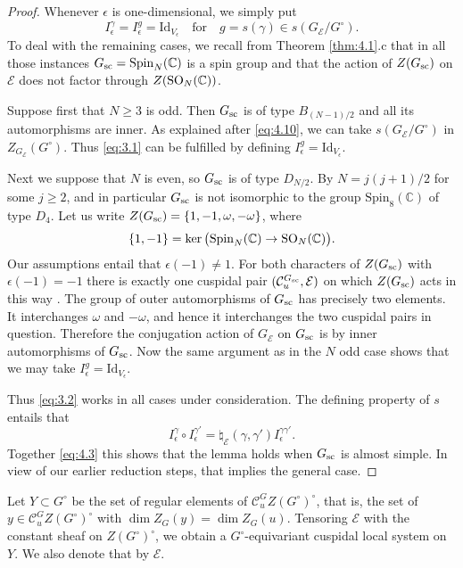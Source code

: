\documentclass[11pt]{amsart}
\theoremstyle{definition}
\newcommand{\C}{\mathbb C}
\def\SO{{\rm SO}}
\def\cC{{\mathcal C}}
\def\cE{{\mathcal E}}
\def\sc{{\rm sc}}
\begin{document}
\begin{proof}
Whenever $\epsilon$ is one-dimensional, we simply put 
\begin{equation}\label{eq:3.2}
I^\gamma_\epsilon = I^g_\epsilon = \mathrm{Id}_{V_\epsilon} \quad \text{for} 
\quad g = s(\gamma) \in s (G_\cE / G^\circ) .
\end{equation}
To deal with the remaining cases, we recall from Theorem \ref{thm:4.1}.c that in
all those instances $G_\sc = \mathrm{Spin}_N (\C)$ is a spin group and that the
action of $Z(G_\sc)$ on $\cE$ does not factor through $Z(\SO_N (\C))$.

Suppose first that $N \geq 3$ is odd. Then $G_\sc$ is of type $B_{(N-1)/2}$ and all
its automorphisms are inner. As explained after \eqref{eq:4.10}, we can take
$s (G_\cE / G^\circ)$ in $Z_{G_\cE}(G^\circ)$. Thus \eqref{eq:3.1} can be fulfilled
by defining $I^g_\epsilon = \mathrm{Id}_{V_\epsilon}$. 

Next we suppose that $N$ is even, so $G_\sc$ is of type $D_{N/2}$. By 
\cite[Proposition 14.6]{Lus1} $N = j (j+1) / 2$ for some $j \geq 2$, and in particular
$G_\sc$ is not isomorphic to the group $\mathrm{Spin}_8 (\C)$ of type $D_4$. 
Let us write $Z(G_\sc) = \{1,-1,\omega,-\omega\}$, where
\[
\{1,-1\} = \ker \big( \mathrm{Spin}_N (\C) \to \SO_N (\C) \big) . 
\]
Our assumptions entail that $\epsilon (-1) \neq 1$. For both characters of $Z(G_\sc)$
with $\epsilon (-1) = -1$ there is exactly one cuspidal pair $(\cC_u^{G_\sc},\cE)$ on 
which $Z (G_\sc)$ acts in this way \cite[Proposition 14.6]{Lus1}. The group of outer 
automorphisms of $G_\sc$ has precisely two elements. It interchanges $\omega$ and
$-\omega$, and hence it interchanges the two cuspidal pairs in question. Therefore 
the conjugation action of $G_\cE$ on $G_\sc$ is by inner automorphisms
of $G_\sc$. Now the same argument as in the $N$ odd case shows that we may take
$I^g_\epsilon = \mathrm{Id}_{V_\epsilon}$. 

Thus \eqref{eq:3.2} works in all cases under consideration. The defining property 
of $s$ entails that
\begin{equation}\label{eq:4.2}
I^\gamma_\epsilon \circ I^{\gamma'}_\epsilon = \natural_\cE (\gamma,\gamma') 
I^{\gamma \gamma'}_\epsilon .
\end{equation}
Together \eqref{eq:4.3} this shows that the lemma holds when $G_{\sc}$ is almost 
simple. In view of our earlier reduction steps, that implies the general case.
\end{proof}

Let $Y \subset G^\circ$ be the set of regular elements of $\cC_u^G Z(G^\circ)^\circ$, 
that is, the set of $y \in \cC_u^G Z(G^\circ)^\circ$ with $\dim Z_G (y) = \dim Z_G (u)$. 
Tensoring $\cE$ with the constant sheaf on $Z(G^\circ)^\circ$, we obtain a 
$G^\circ$-equivariant cuspidal local system on $Y$. We also denote that by $\cE$.
\end{document}
